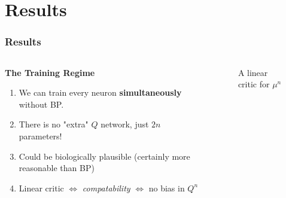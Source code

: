 \documentclass{beamer}
\newcommand*{\Scale}[2][4]{\scalebox{#1}{$#2$}}%
\numberwithin{equation}{subsection}
\numberwithin{theorem}{subsection}
\begin{document}
\section{Results}
\begin{frame}
\frametitle{Results}
      \begin{columns}
      \begin{column}{0.6\textwidth}

  \textbf{The Training Regime}
  \begin{enumerate}
  \item We can train every neuron \textbf{simultaneously} without BP.
  \item There is no "extra" $Q$ network, just $2n$ parameters!
  \item Could be biologically plausible (certainly more reasonable than BP)
  \item Linear critic $\iff$ \emph{compatability} $\iff$ no bias in $Q^n$
  \end{enumerate}
      \end{column}
      \begin{column}{0.4\textwidth}
      \begin{figure}
          \begin{centering}
          \end{centering}
          \caption{A linear critic for $\mu^n$ }
      \end{figure}

      \end{column}
    \end{columns}

\end{frame}
\end{document}
